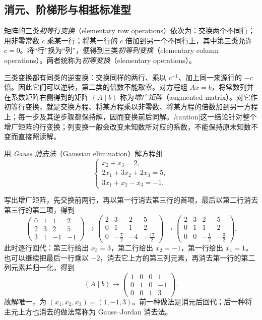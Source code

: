 \subsection{消元、阶梯形与相抵标准型}

\begin{definition}
\label{def:matrix-elementary-transformations}
矩阵的三类\emph{初等行变换}（elementary row operations）依次为：交换两个不同行；用非零常数 $c$ 乘某一行；将某一行的 $c$ 倍加到另一个不同行上，其中第三类允许 $c=0$。将“行”换为“列”，便得到三类\emph{初等列变换}（elementary column operations）。两者统称为\emph{初等变换}（elementary operations）。
\end{definition}

三类变换都有同类的逆变换：交换同样的两行、乘以 $c^{-1}$、加上同一来源行的 $-c$ 倍。因此它们可以逆转，第二类的倍数不能取零。对方程组 $Ax=b$，将常数列并在系数矩阵右侧得到的矩阵 $(A\mid b)$ 称为\emph{增广矩阵}（augmented matrix）。对它作初等行变换，就是交换方程、将某方程乘以非零数、将某方程的倍数加到另一方程上；每一步及其逆步骤都保持解，因而变换前后同解。\emph[caution]{这一结论针对整个增广矩阵的行变换；列变换一般会改变未知数所对应的系数，不能保持原未知数不变而直接照读解。}

\begin{example}
\label{ex:matrix-gaussian-elimination}
用 \emph{Gauss 消去法}（Gaussian elimination）解方程组
\[
    \begin{cases}
        x_2+x_3=2,\\
        2x_1+3x_2+2x_3=5,\\
        3x_1+x_2-x_3=-1.
    \end{cases}
\]
\end{example}

\begin{solve}
写出增广矩阵，先交换前两行，再以第一行消去第三行的首项，最后以第二行消去第三行的第二项，得到
\[
    \begin{pmatrix}0&1&1&2\\2&3&2&5\\3&1&-1&-1\end{pmatrix}
    \longrightarrow
    \begin{pmatrix}2&3&2&5\\0&1&1&2\\0&-\frac72&-4&-\frac{17}2\end{pmatrix}
    \longrightarrow
    \begin{pmatrix}2&3&2&5\\0&1&1&2\\0&0&-\frac12&-\frac32\end{pmatrix}.
\]
此时逐行回代：第三行给出 $x_3=3$，第二行给出 $x_2=-1$，第一行给出 $x_1=1$。也可以继续把最后一行乘以 $-2$，消去它上方的第三列元素，再消去第一行的第二列元素并归一化，得到
\[
    (A\mid b)\longrightarrow
    \begin{pmatrix}1&0&0&1\\0&1&0&-1\\0&0&1&3\end{pmatrix}.
\]
故解唯一，为 $(x_1,x_2,x_3)=(1,-1,3)$。前一种做法是消元后回代；后一种将主元上方也消去的做法常称为 Gauss--Jordan 消去法。
\end{solve}

